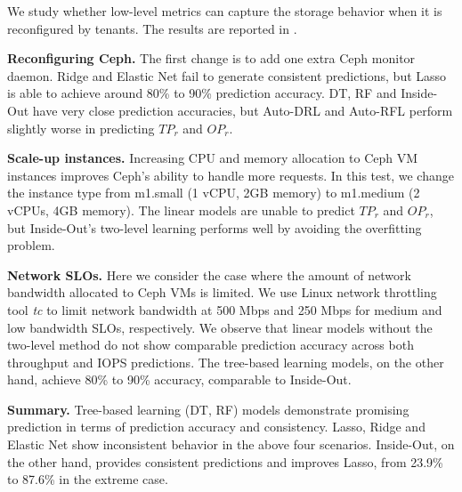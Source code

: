 We study whether low-level metrics can capture the storage behavior when it is reconfigured by tenants. The results are reported in \myfigure{\ref{fig:reconfiguring_storage}}.


\textbf{Reconfiguring Ceph.}
The first change is to add one extra Ceph monitor daemon. %
Ridge and Elastic Net fail to generate consistent predictions, but Lasso is able to achieve around 80\% to 90\% prediction accuracy.
DT, RF and Inside-Out have very close prediction accuracies, but Auto-DRL and Auto-RFL perform slightly worse in predicting $TP_r$ and $OP_r$.

\textbf{Scale-up instances.}
Increasing CPU and memory allocation to Ceph VM instances improves Ceph's ability to handle more requests.
In this test, we change the instance type from m1.small (1 vCPU, 2GB memory) to m1.medium (2 vCPUs, 4GB memory).
The linear models are unable to predict $TP_r$ and $OP_r$, but Inside-Out's two-level learning performs well by avoiding the overfitting problem. 

\textbf{Network SLOs.}
Here we consider the case where the amount of network bandwidth allocated to Ceph VMs is limited. 
We use Linux network throttling tool \textit{tc} to limit network bandwidth at 500 Mbps and 250 Mbps for medium and low bandwidth SLOs, respectively.
We observe that linear models without the two-level method do not show comparable prediction accuracy across both throughput and IOPS predictions.
The tree-based learning models, on the other hand, achieve 80\% to 90\% accuracy, comparable to Inside-Out.


\textbf{Summary.}
Tree-based learning (DT, RF) models demonstrate promising prediction in terms of prediction accuracy and consistency.
Lasso, Ridge and Elastic Net show inconsistent behavior in the above four scenarios.
Inside-Out, on the other hand, provides consistent predictions and improves Lasso, from 23.9\% to 87.6\% in the extreme case.


